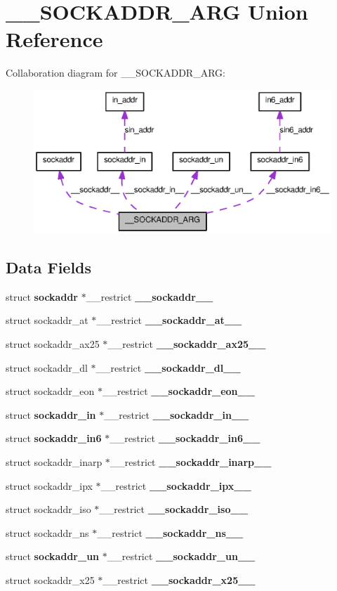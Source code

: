 \section{\_\-\_\-SOCKADDR\_\-ARG Union Reference}
\label{union____SOCKADDR__ARG}


Collaboration diagram for \_\-\_\-SOCKADDR\_\-ARG:
\nopagebreak
\begin{figure}[H]
\begin{center}
\leavevmode
\includegraphics[width=400pt]{union____SOCKADDR__ARG__coll__graph}
\end{center}
\end{figure}
\subsection*{Data Fields}
\begin{DoxyCompactItemize}
\item 
struct {\bf sockaddr} $\ast$\_\-\_\-restrict {\bf \_\-\_\-sockaddr\_\-\_\-}
\item 
struct sockaddr\_\-at $\ast$\_\-\_\-restrict {\bf \_\-\_\-sockaddr\_\-at\_\-\_\-}
\item 
struct sockaddr\_\-ax25 $\ast$\_\-\_\-restrict {\bf \_\-\_\-sockaddr\_\-ax25\_\-\_\-}
\item 
struct sockaddr\_\-dl $\ast$\_\-\_\-restrict {\bf \_\-\_\-sockaddr\_\-dl\_\-\_\-}
\item 
struct sockaddr\_\-eon $\ast$\_\-\_\-restrict {\bf \_\-\_\-sockaddr\_\-eon\_\-\_\-}
\item 
struct {\bf sockaddr\_\-in} $\ast$\_\-\_\-restrict {\bf \_\-\_\-sockaddr\_\-in\_\-\_\-}
\item 
struct {\bf sockaddr\_\-in6} $\ast$\_\-\_\-restrict {\bf \_\-\_\-sockaddr\_\-in6\_\-\_\-}
\item 
struct sockaddr\_\-inarp $\ast$\_\-\_\-restrict {\bf \_\-\_\-sockaddr\_\-inarp\_\-\_\-}
\item 
struct sockaddr\_\-ipx $\ast$\_\-\_\-restrict {\bf \_\-\_\-sockaddr\_\-ipx\_\-\_\-}
\item 
struct sockaddr\_\-iso $\ast$\_\-\_\-restrict {\bf \_\-\_\-sockaddr\_\-iso\_\-\_\-}
\item 
struct sockaddr\_\-ns $\ast$\_\-\_\-restrict {\bf \_\-\_\-sockaddr\_\-ns\_\-\_\-}
\item 
struct {\bf sockaddr\_\-un} $\ast$\_\-\_\-restrict {\bf \_\-\_\-sockaddr\_\-un\_\-\_\-}
\item 
struct sockaddr\_\-x25 $\ast$\_\-\_\-restrict {\bf \_\-\_\-sockaddr\_\-x25\_\-\_\-}
\end{DoxyCompactItemize}


